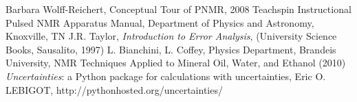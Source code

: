 \documentclass[11pt,letterpaper]{article}
\begin{document}
\begin{thebibliography}{99}
 Barbara Wolff-Reichert, Conceptual Tour of PNMR, 2008 
 Teachspin Instructional Pulsed NMR Apparatus Manual, Department of Physics and Astronomy, Knoxville, TN
 J.R. Taylor, {\it Introduction to Error Analysis}, (University Science Books, Sausalito, 1997)
 L. Bianchini, L. Coffey, Physics Department, Brandeis University, NMR Techniques Applied to Mineral Oil, Water, and Ethanol (2010)
 {\it Uncertainties}: a Python package for calculations with uncertainties, Eric O. LEBIGOT, http://pythonhosted.org/uncertainties/

\end{thebibliography}
\end{document}
